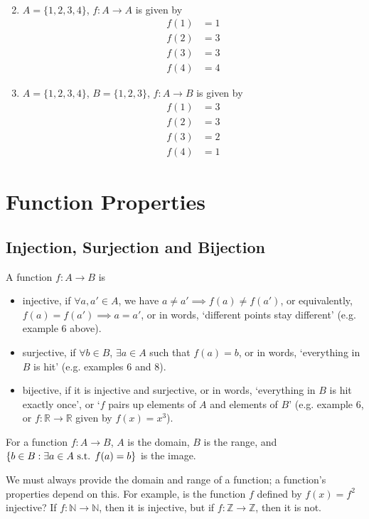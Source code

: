 \documentclass{article}
\begin{document}
\begin{enumerate}
\begin{align*}
	      \end{align*}
	\item $A = \{ 1, 2, 3, 4 \}$, $f\colon A \to A$ is given by
	      \begin{align*}
		      f(1) & = 1 \\
		      f(2) & = 3 \\
		      f(3) & = 3 \\
		      f(4) & = 4
	      \end{align*}
	\item $A = \{ 1, 2, 3, 4 \}$, $B = \{ 1, 2, 3 \}$, $f\colon A \to B$ is given by
	      \begin{align*}
		      f(1) & = 3 \\
		      f(2) & = 3 \\
		      f(3) & = 2 \\
		      f(4) & = 1
	      \end{align*}
\end{enumerate}

\section{Function Properties}
\subsection{Injection, Surjection and Bijection}
\begin{definition}
	A function $f\colon A \to B$ is
	\begin{itemize}
		\item injective, if $\forall a, a' \in A$, we have $a \neq a' \implies f(a) \neq f(a')$, or equivalently, $f(a) = f(a') \implies a = a'$, or in words, `different points stay different' (e.g. example 6 above).
		\item surjective, if $\forall b \in B$, $\exists a \in A$ such that $f(a) = b$, or in words, `everything in $B$ is hit' (e.g. examples 6 and 8).
		\item bijective, if it is injective and surjective, or in words, `everything in $B$ is hit exactly once', or `$f$ pairs up elements of $A$ and elements of $B$' (e.g. example 6, or $f\colon \mathbb R \to \mathbb R$ given by $f(x) = x^3$).
	\end{itemize}
\end{definition}
\begin{definition}
	For a function $f\colon A \to B$, $A$ is the domain, $B$ is the range, and $\{ b \in B : \exists a \in A \text{ s.t. } f(a) = b \}$ is the image.
\end{definition}
We must always provide the domain and range of a function; a function's properties depend on this. For example, is the function $f$ defined by $f(x) = f^2$ injective? If $f\colon \mathbb N \to \mathbb N$, then it is injective, but if $f\colon \mathbb Z \to \mathbb Z$, then it is not.
\end{document}
